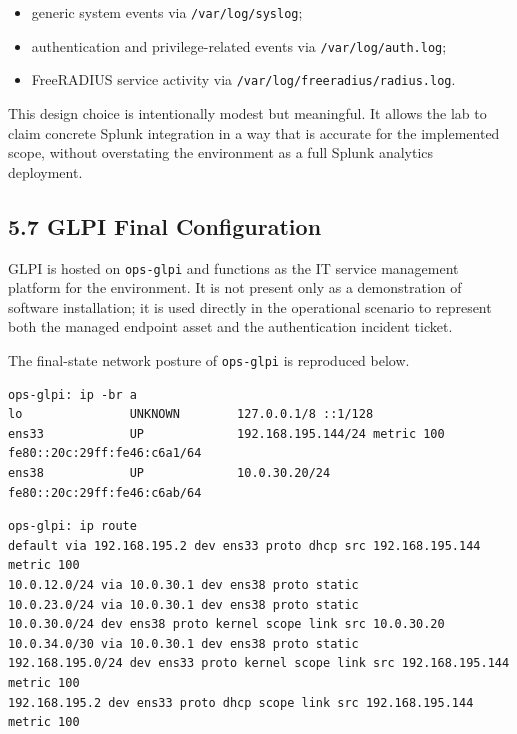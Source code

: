 \documentclass[11pt]{article}
\begin{document}
\begin{itemize}
    \item generic system events via \texttt{/var/log/syslog};
    \item authentication and privilege-related events via \texttt{/var/log/auth.log};
    \item FreeRADIUS service activity via \texttt{/var/log/freeradius/radius.log}.
\end{itemize}

This design choice is intentionally modest but meaningful. It allows the lab to claim concrete Splunk integration in a way that is accurate for the implemented scope, without overstating the environment as a full Splunk analytics deployment.


\subsection{5.7 GLPI Final Configuration}
\label{sec:glpi-final-configuration}

GLPI is hosted on \texttt{ops-glpi} and functions as the IT service management platform for the environment. It is not present only as a demonstration of software installation; it is used directly in the operational scenario to represent both the managed endpoint asset and the authentication incident ticket.

The final-state network posture of \texttt{ops-glpi} is reproduced below.

\begin{verbatim}
ops-glpi: ip -br a
lo               UNKNOWN        127.0.0.1/8 ::1/128
ens33            UP             192.168.195.144/24 metric 100 fe80::20c:29ff:fe46:c6a1/64
ens38            UP             10.0.30.20/24 fe80::20c:29ff:fe46:c6ab/64
\end{verbatim}

\begin{verbatim}
ops-glpi: ip route
default via 192.168.195.2 dev ens33 proto dhcp src 192.168.195.144 metric 100
10.0.12.0/24 via 10.0.30.1 dev ens38 proto static
10.0.23.0/24 via 10.0.30.1 dev ens38 proto static
10.0.30.0/24 dev ens38 proto kernel scope link src 10.0.30.20
10.0.34.0/30 via 10.0.30.1 dev ens38 proto static
192.168.195.0/24 dev ens33 proto kernel scope link src 192.168.195.144 metric 100
192.168.195.2 dev ens33 proto dhcp scope link src 192.168.195.144 metric 100
\end{verbatim}
\end{document}
